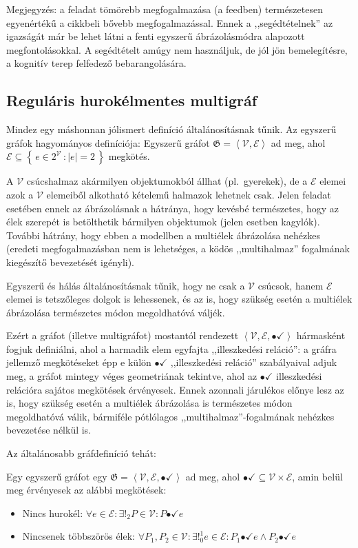 \documentclass{article}
\newcommand{\incidsymbol}{\bullet\!\!\!\checkmark}
\newcommand{\incid}{\mathrel{\incidsymbol}} %
\begin{document}
	Megjegyzés: a feladat tömörebb megfogalmazása (a feedben) természetesen egyenértékű a cikkbeli bővebb megfogalmazással.
	Ennek a ,,segédtételnek'' az igazságát már be lehet látni a fenti egyszerű ábrázolásmódra alapozott megfontolásokkal.
	A segédtételt amúgy nem használjuk, de jól jön bemelegítésre, a kognitív terep felfedező bebarangolására.

	\subsection{Reguláris hurokélmentes multigráf}

	Mindez egy máshonnan jólismert definíció általánosításnak tűnik.
	Az egyszerű gráfok hagyományos definíciója:
	Egyszerű gráfot $\mathfrak G = \left\langle \mathcal V, \mathcal E \right\rangle$ ad meg, ahol $\mathcal E \subseteq \left\{\,e \in 2^{\mathcal V}\, : \left|e\right| = 2\,\right\}$ megkötés.

	A $\mathcal V$ csúcshalmaz akármilyen objektumokból állhat (pl.~gyerekek), de a $\mathcal E$ elemei azok a $\mathcal V$ elemeiből alkotható kételemű halmazok lehetnek csak. Jelen feladat esetében ennek az ábrázolásnak a hátránya, hogy kevésbé természetes, hogy az élek szerepét is betölthetik bármilyen objektumok (jelen esetben kagylók). További hátrány, hogy ebben a modellben a multiélek ábrázolása nehézkes (eredeti megfogalmazásban nem is lehetséges, a ködös ,,multihalmaz'' fogalmának kiegészítő bevezetését igényli).

	Egyszerű és hálás általánosításnak tűnik, hogy ne csak a $\mathcal V$ csúcsok, hanem $\mathcal E$ elemei is tetszőleges dolgok is lehessenek, és az is, hogy szükség esetén a multiélek ábrázolása természetes módon megoldhatóvá váljék.
	
	Ezért a gráfot (illetve multigráfot) mostantól rendezett $\left\langle \mathcal V, \mathcal E, \incidsymbol\right\rangle$ hármasként fogjuk definiálni, ahol a harmadik elem egyfajta ,,illeszkedési reláció'': a gráfra jellemző megkötéseket épp e külön $\incid$ ,,illeszkedési reláció'' szabályaival adjuk meg, a gráfot mintegy véges geometriának tekintve, ahol az $\incid$ illeszkedési relációra sajátos megkötések érvényesek. Ennek azonnali járulékos előnye lesz az is, hogy szükség esetén a multiélek ábrázolása is természetes módon megoldhatóvá válik, bármiféle pótlólagos ,,multihalmaz''-fogalmának nehézkes bevezetése nélkül is.

	Az általánosabb gráfdefiníció tehát:

	Egy egyszerű gráfot egy $\mathfrak G = \left\langle \mathcal V, \mathcal E, \incidsymbol\right\rangle$ ad meg, ahol $\incidsymbol \subseteq \mathcal V \times \mathcal E$, amin belül meg érvényesek az alábbi megkötések:
	\begin{itemize}
		\item
		Nincs hurokél: $\forall e \in \mathcal E: \exists!_2 P \in \mathcal V: P \incid e$ 
		\item
		Nincsenek többszörös élek: $\forall P_1, P_2 \in \mathcal V: \exists!_0^1 e \in \mathcal E: P_1  \incid e \land P_2 \incid e$
	\end{itemize}
\end{document}
